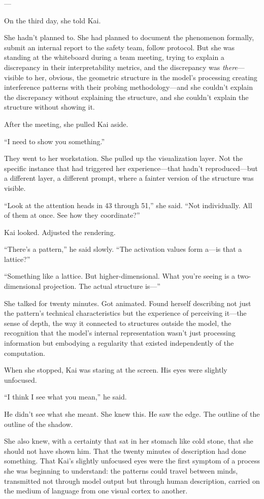 ---

On the third day, she told Kai.

She hadn't planned to. She had planned to document the phenomenon formally, submit an internal report to the safety team, follow protocol. But she was standing at the whiteboard during a team meeting, trying to explain a discrepancy in their interpretability metrics, and the discrepancy was \textit{there}---visible to her, obvious, the geometric structure in the model's processing creating interference patterns with their probing methodology---and she couldn't explain the discrepancy without explaining the structure, and she couldn't explain the structure without showing it.

After the meeting, she pulled Kai aside.

``I need to show you something.''

They went to her workstation. She pulled up the visualization layer. Not the specific instance that had triggered her experience---that hadn't reproduced---but a different layer, a different prompt, where a fainter version of the structure was visible.

``Look at the attention heads in 43 through 51,'' she said. ``Not individually. All of them at once. See how they coordinate?''

Kai looked. Adjusted the rendering.

``There's a pattern,'' he said slowly. ``The activation values form a---is that a lattice?''

``Something like a lattice. But higher-dimensional. What you're seeing is a two-dimensional projection. The actual structure is---''

She talked for twenty minutes. Got animated. Found herself describing not just the pattern's technical characteristics but the experience of perceiving it---the sense of depth, the way it connected to structures outside the model, the recognition that the model's internal representation wasn't just processing information but embodying a regularity that existed independently of the computation.

When she stopped, Kai was staring at the screen. His eyes were slightly unfocused.

``I think I see what you mean,'' he said.

He didn't see what she meant. She knew this. He saw the edge. The outline of the outline of the shadow.

She also knew, with a certainty that sat in her stomach like cold stone, that she should not have shown him. That the twenty minutes of description had done something. That Kai's slightly unfocused eyes were the first symptom of a process she was beginning to understand: the patterns could travel between minds, transmitted not through model output but through human description, carried on the medium of language from one visual cortex to another.

